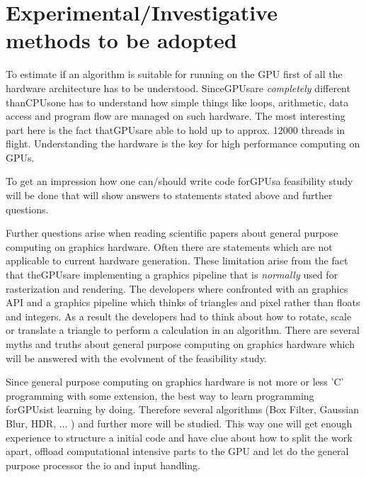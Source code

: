 \section*{Experimental/Investigative methods to be adopted} 
\label{ssub:experimental_investigative_methods_to_be_adopted} 
To estimate if an algorithm is suitable for running on the \gls{GPU} first of all the
hardware architecture has to be understood. Since\glspl{GPU}are \emph{completely}
different than\glspl{CPU}one has to understand how simple things like loops,
arithmetic, data access and program flow are managed on such hardware. The most
interesting part here is the fact that\glspl{GPU}are able to hold up to approx. 12000
threads in flight. Understanding the hardware is the key for high performance 
computing on GPUs.

To get an impression how one can/should write code for\glspl{GPU}a feasibility study
will be done that will show answers to statements stated above and further 
questions. 

Further questions arise when reading scientific papers about general purpose
computing on graphics hardware. Often there are statements which are not
applicable to current hardware generation. These limitation arise from the fact
that the\glspl{GPU}are implementing a graphics pipeline that is \emph{normally} used
for rasterization and rendering. The developers where confronted with an
graphics API and a graphics pipeline which thinks of triangles and pixel rather
than floats and integers. As a result the developers had to think about how to
rotate, scale or translate a triangle to perform a calculation in an algorithm.
There are several myths and truths about general purpose computing on graphics 
hardware which will be answered with the evolvment of the feasibility study. 

Since general purpose computing on graphics hardware is not more or less 'C'
programming with some extension, the best way to learn programming for\glspl{GPU}ist
learning by doing. Therefore several algorithms (Box Filter, Gaussian Blur, HDR,
... ) and further more will be studied.
This way one will get enough experience to structure a initial code and have
clue about how to split the work apart, offload computational intensive parts to
the \gls{GPU} and let do the general purpose processor the io and input handling.

